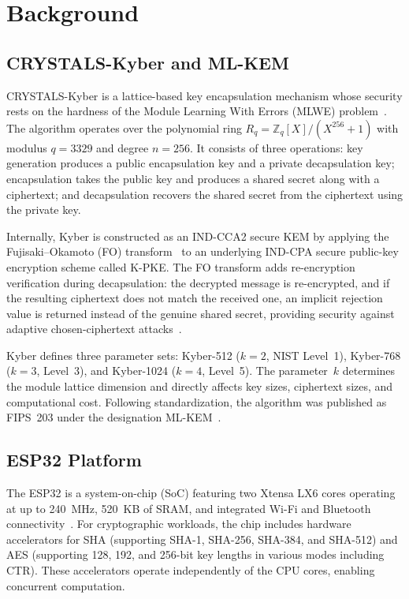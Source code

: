 \documentclass[journal]{IEEEtran}
\begin{document}
\section{Background}

\subsection{CRYSTALS-Kyber and ML-KEM}

CRYSTALS-Kyber is a lattice-based key encapsulation mechanism whose security rests on the hardness of the Module Learning With Errors (MLWE) problem~\cite{kyber2021, langlois2012}. The algorithm operates over the polynomial ring $R_q = \mathbb{Z}_q[X]/(X^{256}+1)$ with modulus $q = 3329$ and degree $n = 256$. It consists of three operations: key generation produces a public encapsulation key and a private decapsulation key; encapsulation takes the public key and produces a shared secret along with a ciphertext; and decapsulation recovers the shared secret from the ciphertext using the private key.

Internally, Kyber is constructed as an IND-CCA2 secure KEM by applying the Fujisaki--Okamoto (FO) transform~\cite{fujisaki1999} to an underlying IND-CPA secure public-key encryption scheme called K-PKE. The FO transform adds re-encryption verification during decapsulation: the decrypted message is re-encrypted, and if the resulting ciphertext does not match the received one, an implicit rejection value is returned instead of the genuine shared secret, providing security against adaptive chosen-ciphertext attacks~\cite{shoup2000}.

Kyber defines three parameter sets: Kyber-512 ($k=2$, NIST Level~1), Kyber-768 ($k=3$, Level~3), and Kyber-1024 ($k=4$, Level~5). The parameter~$k$ determines the module lattice dimension and directly affects key sizes, ciphertext sizes, and computational cost. Following standardization, the algorithm was published as FIPS~203 under the designation ML-KEM~\cite{fips203}.

\subsection{ESP32 Platform}

The ESP32 is a system-on-chip (SoC) featuring two Xtensa LX6 cores operating at up to 240~MHz, 520~KB of SRAM, and integrated Wi-Fi and Bluetooth connectivity~\cite{esp32trm, maier2017}. For cryptographic workloads, the chip includes hardware accelerators for SHA (supporting SHA-1, SHA-256, SHA-384, and SHA-512) and AES (supporting 128, 192, and 256-bit key lengths in various modes including CTR). These accelerators operate independently of the CPU cores, enabling concurrent computation.
\end{document}
